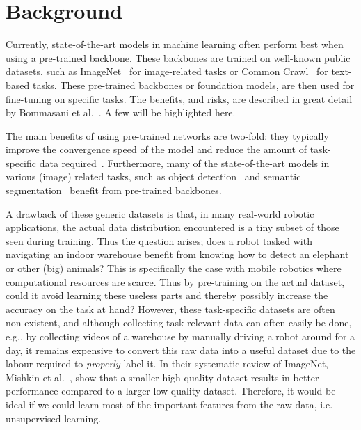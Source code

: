\chapter{Background}\label{chapter:background}
Currently, state-of-the-art models in machine learning often perform best when using a pre-trained backbone. These backbones are trained on well-known public datasets, such as ImageNet~\cite{deng2009imagenet} for image-related tasks or Common Crawl~\cite{commoncrawl} for text-based tasks. These pre-trained backbones or foundation models, are then used for fine-tuning on specific tasks. The benefits, and risks, are described in great detail by Bommasani et al.~\cite{DBLP:journals/corr/abs-2108-07258}. A few will be highlighted here.

The main benefits of using pre-trained networks are two-fold: they typically improve the convergence speed of the model and reduce the amount of task-specific data required~\cite{donahue2014decaf,zeiler2014visualizing}. Furthermore, many of the state-of-the-art models in various (image) related tasks, such as object detection~\cite{liu2016ssd,redmon2016you} and semantic segmentation~\cite{orsic2019defense,girshick2014rich} benefit from pre-trained backbones.

A drawback of these generic datasets is that, in many real-world robotic applications, the actual data distribution encountered is a tiny subset of those seen during training. Thus the question arises; does a robot tasked with navigating an indoor warehouse benefit from knowing how to detect an elephant or other (big) animals? This is specifically the case with mobile robotics where computational resources are scarce. Thus by pre-training on the actual dataset, could it avoid learning these useless parts and thereby possibly increase the accuracy on the task at hand? However, these task-specific datasets are often non-existent, and although collecting task-relevant data can often easily be done, e.g., by collecting videos of a warehouse by manually driving a robot around for a day, it remains expensive to convert this raw data into a useful dataset due to the labour required to \emph{properly} label it.
In their systematic review of ImageNet, Mishkin et al.~\cite{MISHKIN201711}, show that a smaller high-quality dataset results in better performance compared to a larger low-quality dataset. Therefore, it would be ideal if we could learn most of the important features from the raw data, i.e. unsupervised learning.

